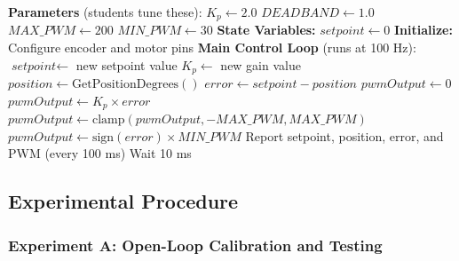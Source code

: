\begin{algorithm}
\caption{Closed-Loop Proportional Position Control}
\label{alg:closedloop}
\begin{algorithmic}[1]
\State \textbf{Parameters} (students tune these):
\State \hspace{1em} $K_p \gets 2.0$ 
\State \hspace{1em} $\textit{DEADBAND} \gets 1.0$ 
\State \hspace{1em} $\textit{MAX\_PWM} \gets 200$
\State \hspace{1em} $\textit{MIN\_PWM} \gets 30$ 
\State
\State \textbf{State Variables:}
\State \hspace{1em} $\textit{setpoint} \gets 0$
\State
\State \textbf{Initialize:}
\State \hspace{1em} Configure encoder and motor pins
\State
\State \textbf{Main Control Loop} (runs at 100 Hz):
            \State $\textit{setpoint} \gets$ new setpoint value
            \State $K_p \gets$ new gain value
        \EndIf
    \EndIf
    \State
    \State $\textit{position} \gets \text{GetPositionDegrees}()$
    \State $\textit{error} \gets \textit{setpoint} - \textit{position}$
    \State $\textit{pwmOutput} \gets 0$
    \State
        \State $\textit{pwmOutput} \gets K_p \times \textit{error}$ 
        \State $\textit{pwmOutput} \gets \text{clamp}(\textit{pwmOutput}, -\textit{MAX\_PWM}, \textit{MAX\_PWM})$
            \State $\textit{pwmOutput} \gets \text{sign}(\textit{error}) \times \textit{MIN\_PWM}$
        \EndIf
    \EndIf
    \State
    \State {}
    \State Report setpoint, position, error, and PWM (every 100 ms)
    \State Wait 10 ms
\EndWhile
\end{algorithmic}
\end{algorithm}

\subsection{Experimental Procedure}

\subsubsection{Experiment A: Open-Loop Calibration and Testing}

